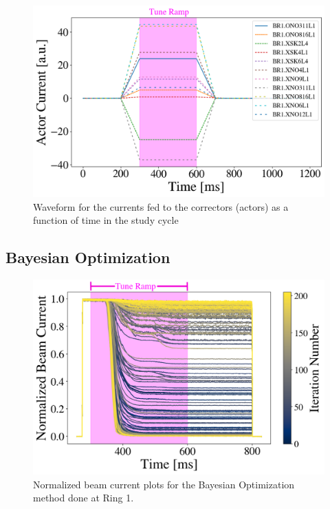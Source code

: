 \begin{figure}[H]
    \centering
    \includegraphics[width=\linewidth]{chapter5/actor_currents.png}
    \caption{Waveform for the currents fed to the correctors (actors) as a function of time in the study cycle}
    \label{fig:actorcurrents}
\end{figure}

\subsection{Bayesian Optimization}

\begin{figure}[H]
    \centering
    \includegraphics[width=\linewidth]{chapter5/i1_bo_commented.png}
    \caption{Normalized beam current plots for the Bayesian Optimization method done at Ring 1.}
    \label{fig:ibo}
\end{figure}

